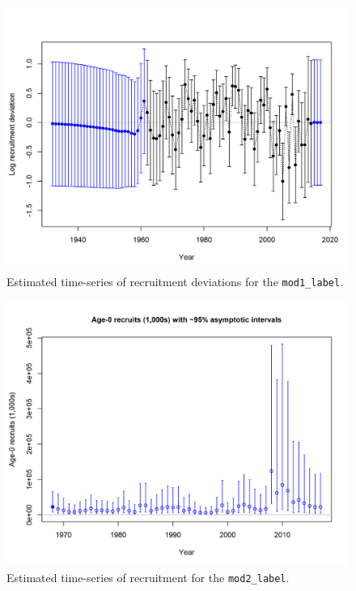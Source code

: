 \documentclass[12pt,]{article}
\begin{document}
\begin{figure}[htbp]
\centering
\includegraphics{r4ss/plots_mod1/recdevs2_withbars.png}
\caption{Estimated time-series of recruitment deviations for the
\texttt{mod1\_label}. \label{fig:recdevs1}}
\end{figure}

\FloatBarrier

\begin{figure}[htbp]
\centering
\includegraphics{r4ss/plots_mod2/ts11_Age-0_recruits_(1000s)_with_95_asymptotic_intervals.png}
\caption{Estimated time-series of recruitment for the
\texttt{mod2\_label}. \label{fig:recruits2}}
\end{figure}
\end{document}
